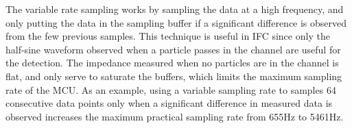 The variable rate sampling works by sampling the data at a high frequency, and only putting the data in the sampling buffer if a significant difference is observed from the few previous samples. This technique is useful in IFC since only the half-sine waveform observed when a particle passes in the channel are useful for the detection. The impedance measured when no particles are in the channel is flat, and only serve to saturate the buffers, which limits the maximum sampling rate of the MCU. As an example, using a variable sampling rate to samples 64 consecutive data points only when a significant difference in measured data is observed increases the maximum practical sampling rate from 655Hz to 5461Hz. %


